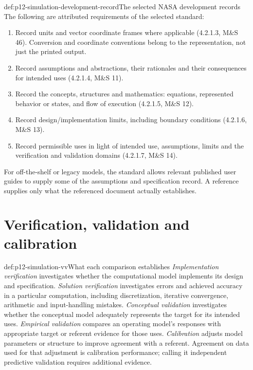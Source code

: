\begin{hbmethod}{def:p12-simulation-development-record}{The selected NASA development records}
The following are attributed requirements of the selected standard:
\begin{enumerate}
\item Record units and vector coordinate frames where applicable
      (4.2.1.3, M\&S 46). Conversion and coordinate conventions belong
      to the representation, not just the printed output.
\item Record assumptions and abstractions, their rationales and their
      consequences for intended uses (4.2.1.4, M\&S 11).
\item Record the concepts, structures and mathematics: equations,
      represented behavior or states, and flow of execution
      (4.2.1.5, M\&S 12).
\item Record design/implementation limits, including boundary
      conditions (4.2.1.6, M\&S 13).
\item Record permissible uses in light of intended use, assumptions,
      limits and the verification and validation domains
      (4.2.1.7, M\&S 14).
\end{enumerate}
For off-the-shelf or legacy models, the standard allows relevant
published user guides to supply some of the assumptions and
specification record. A reference supplies only what the referenced
document actually establishes. \cite[Section 4.2.1]{NASA7009B2024}
\end{hbmethod}

\section{Verification, validation and calibration}

\begin{hbdefinition}{def:p12-simulation-vv}{What each comparison establishes}
\emph{Implementation verification} investigates whether the
computational model implements its design and specification.
\emph{Solution verification} investigates errors and achieved
accuracy in a particular computation, including discretization,
iterative convergence, arithmetic and input-handling mistakes.
\emph{Conceptual validation} investigates whether the conceptual
model adequately represents the target for its intended uses.
\emph{Empirical validation} compares an operating model's responses
with appropriate target or referent evidence for those uses.
\emph{Calibration} adjusts model parameters or structure to improve
agreement with a referent. Agreement on data used for that adjustment
is calibration performance; calling it independent predictive
validation requires additional evidence.
\cite[Sections 3.2 and 4.2.3--4.2.6]{NASA7009B2024}
\end{hbdefinition}

